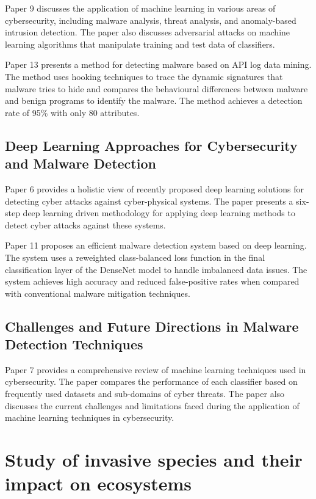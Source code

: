\documentclass{article}
\begin{document}
Paper 9 discusses the application of machine learning in various areas of cybersecurity, including malware analysis, threat analysis, and anomaly-based intrusion detection. The paper also discusses adversarial attacks on machine learning algorithms that manipulate training and test data of classifiers.

Paper 13 presents a method for detecting malware based on API log data mining. The method uses hooking techniques to trace the dynamic signatures that malware tries to hide and compares the behavioural differences between malware and benign programs to identify the malware. The method achieves a detection rate of 95\% with only 80 attributes.

\subsection{Deep Learning Approaches for Cybersecurity and Malware Detection}

Paper 6 provides a holistic view of recently proposed deep learning solutions for detecting cyber attacks against cyber-physical systems. The paper presents a six-step deep learning driven methodology for applying deep learning methods to detect cyber attacks against these systems.

Paper 11 proposes an efficient malware detection system based on deep learning. The system uses a reweighted class-balanced loss function in the final classification layer of the DenseNet model to handle imbalanced data issues. The system achieves high accuracy and reduced false-positive rates when compared with conventional malware mitigation techniques.

\subsection{Challenges and Future Directions in Malware Detection Techniques}

Paper 7 provides a comprehensive review of machine learning techniques used in cybersecurity. The paper compares the performance of each classifier based on frequently used datasets and sub-domains of cyber threats. The paper also discusses the current challenges and limitations faced during the application of machine learning techniques in cybersecurity.



\clearpage
\section{Study of invasive species and their impact on ecosystems}
\end{document}
